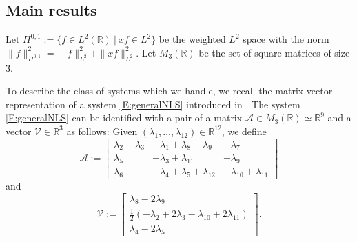 \documentclass[11pt,a4paper,oneside]{amsart}
\theoremstyle{plain}
\theoremstyle{remark}
\numberwithin{equation}{section}
\newcommand{\R}{\mathbb{R}}
\theoremstyle{definition}
\begin{document}
\subsection{Main results}
Let $H^{0,1}:= \{ f\in L^2(\R) \ |\ x f\in L^2\}$ be the weighted $L^2$ space with the norm $\|f\|_{H^{0,1}}^2= \|f\|_{L^2}^2 + \|xf\|_{L^2}^2$.
Let $M_3(\R)$ be the set of square matrices of size $3$.

To describe the class of systems which we handle, we recall the matrix-vector representation of a system \eqref{E:generalNLS} introduced in \cite{MSU2}.
The system \eqref{E:generalNLS} can be identified with a pair of a matrix $\mathscr{A} \in M_3 (\R) \simeq \R^9$ and a vector $\mathscr{V} \in \R^3$ as follows:
Given $(\lambda_1, \dots, \lambda_{12}) \in \R^{12}$, we define
\begin{equation}\label{E:matrixC}
\mathscr{A}:=
\begin{bmatrix}
\lambda_2-\lambda_3 & -\lambda_1+\lambda_8-\lambda_9 & -\lambda_7 \\
\lambda_5 & -\lambda_3+\lambda_{11} & -\lambda_9 \\
\lambda_6 & -\lambda_4+\lambda_5+\lambda_{12} & -\lambda_{10}+\lambda_{11}
\end{bmatrix}  
\end{equation}
and
\begin{equation}\label{E:vectorV}
	\mathscr{V}:=
	\begin{bmatrix} \lambda_8-2\lambda_9 \\ \tfrac12 (-\lambda_2+2\lambda_3-\lambda_{10}+ 2\lambda_{11}) \\  \lambda_4-2\lambda_5 \end{bmatrix}. 
\end{equation}
\end{document}
